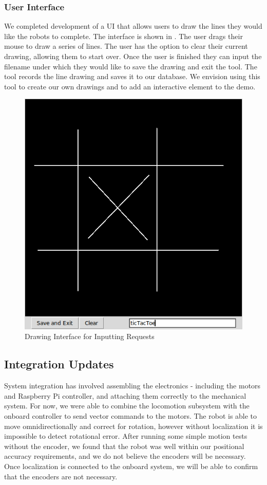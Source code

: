 \subsubsection{User Interface}
We completed development of a UI that allows users to draw the lines they would like the robots to complete. The interface is shown in . The user drags their mouse to draw a series of lines. The user has the option to clear their current drawing, allowing them to start over. Once the user is finished they can input the filename under which they would like to save the drawing and exit the tool. The tool records the line drawing and saves it to our database. We envision using this tool to create our own drawings and to add an interactive element to the demo.   

\begin{figure}[h!]
\centering
\includegraphics[width=0.49\columnwidth]{figs/drawingInterface.png}
\caption{Drawing Interface for Inputting Requests}
\label{fig:drawing_interface}
\end{figure}

\subsection{Integration Updates}
\label{sec:integration_progress}
System integration has involved assembling the electronics - including the motors and Raspberry Pi controller, and attaching them correctly to the mechanical system. For now, we were able to combine the locomotion subsystem with the onboard controller to send vector commands to the motors. The robot is able to move omnidirectionally and correct for rotation, however without localization it is impossible to detect rotational error. After running some simple motion tests without the encoder, we found that the robot was well within our positional accuracy requirements, and we do not believe the encoders will be necessary. Once localization is connected to the onboard system, we will be able to confirm that the encoders are not necessary.


